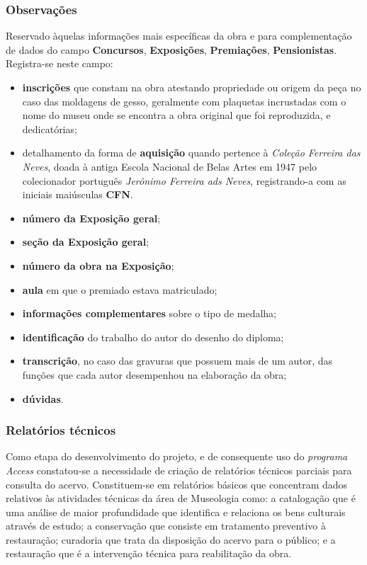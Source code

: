 \subsubsection{Observações}
Reservado àquelas informações mais específicas da obra e para complementação de dados do campo \textbf{Concursos}, \textbf{Exposições}, \textbf{Premiações}, \textbf{Pensionistas}.
Registra-se neste campo:
\begin{itemize}
	\item \textbf{inscrições} que constam na obra atestando propriedade ou origem da peça no caso das moldagens de gesso, geralmente com plaquetas incrustadas com o nome do museu onde se encontra a obra original que foi reproduzida, e dedicatórias;
	\item detalhamento da forma de \textbf{aquisição} quando pertence à \textit{Coleção Ferreira das Neves}, doada à antiga Escola Nacional de Belas Artes em 1947 pelo colecionador português \textit{Jerônimo Ferreira ads Neves}, registrando-a com as iniciais maiúsculas \textbf{CFN}.
	\item \textbf{número da Exposição geral}; 
	\item \textbf{seção da Exposição geral};
	\item \textbf{número da obra na Exposição};
	\item \textbf{aula} em que o premiado estava matriculado;
	\item \textbf{informações complementares} sobre o tipo de medalha;
	\item \textbf{identificação} do trabalho do autor do desenho do diploma;
	\item \textbf{transcrição}, no caso das gravuras que possuem mais de um autor, das funções que cada autor desempenhou na elaboração da obra;
	\item \textbf{dúvidas}.
\end{itemize}


\subsubsection{Relatórios técnicos}
Como etapa do desenvolvimento do projeto, e de consequente uso do \textit{programa Access} constatou-se a necessidade de criação de relatórios técnicos parciais para consulta do acervo. Constituem-se em relatórios básicos que concentram dados relativos às atividades técnicas da área de Museologia como: a catalogação que é uma análise de maior profundidade que identifica e relaciona os bens culturais através de estudo; a conservação que consiste em tratamento preventivo à restauração; curadoria que trata da disposição do acervo para o público; e a restauração que é a intervenção técnica para reabilitação da obra. 

